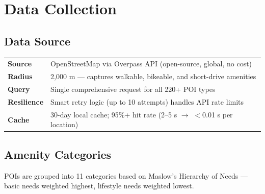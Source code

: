 \documentclass[11pt,a4paper]{article}
\begin{document}
\section{Data Collection}

\subsection{Data Source}

\begin{tabular}{@{}ll@{}}
  \textbf{Source}   & OpenStreetMap via Overpass API (open-source, global, no cost) \\
  \textbf{Radius}   & 2{,}000 m --- captures walkable, bikeable, and short-drive amenities \\
  \textbf{Query}    & Single comprehensive request for all 220+ POI types \\
  \textbf{Resilience} & Smart retry logic (up to 10 attempts) handles API rate limits \\
  \textbf{Cache}    & 30-day local cache; 95\%+ hit rate (2--5 s $\to$ $<$0.01 s per location)
\end{tabular}

\subsection{Amenity Categories}

POIs are grouped into 11 categories based on Maslow's Hierarchy of Needs --- basic needs weighted highest, lifestyle needs weighted lowest.
\end{document}
